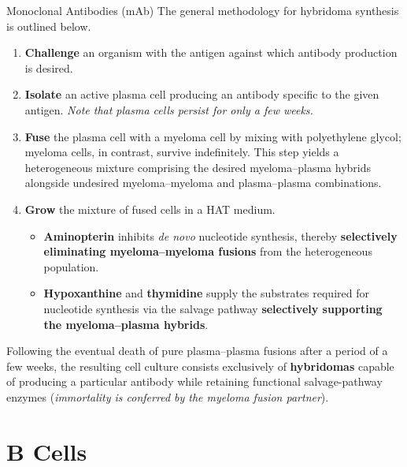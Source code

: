 \begin{core}{Monoclonal Antibodies (mAb)}
      The general methodology for hybridoma synthesis is outlined below.

      \begin{enumerate}[label=(\arabic*)]

        \item \textbf{Challenge} an organism with the antigen against which antibody production is desired.

        \item \textbf{Isolate} an active plasma cell producing an antibody specific to the given antigen. \textit{Note that plasma cells persist for only a few weeks.}

        \item \textbf{Fuse} the plasma cell with a myeloma cell by mixing with polyethylene glycol; myeloma cells, in contrast, survive indefinitely. This step yields a heterogeneous mixture comprising the desired myeloma--plasma hybrids alongside undesired myeloma--myeloma and plasma--plasma combinations.

        \item \textbf{Grow} the mixture of fused cells in a HAT medium.

        \begin{itemize}

          \item \textbf{Aminopterin} inhibits \textit{de novo} nucleotide synthesis, thereby \textbf{selectively eliminating myeloma--myeloma fusions} from the heterogeneous population.

          \item \textbf{Hypoxanthine} and \textbf{thymidine} supply the substrates required for nucleotide synthesis via the salvage pathway \textbf{selectively supporting the myeloma--plasma hybrids}.

        \end{itemize}

      \end{enumerate}

      Following the eventual death of pure plasma--plasma fusions after a period of a few weeks, the resulting cell culture consists exclusively of \textbf{hybridomas} capable of producing a particular antibody while retaining functional salvage-pathway enzymes (\textit{immortality is conferred by the myeloma fusion partner}).

    \end{core}

\section{B Cells}

